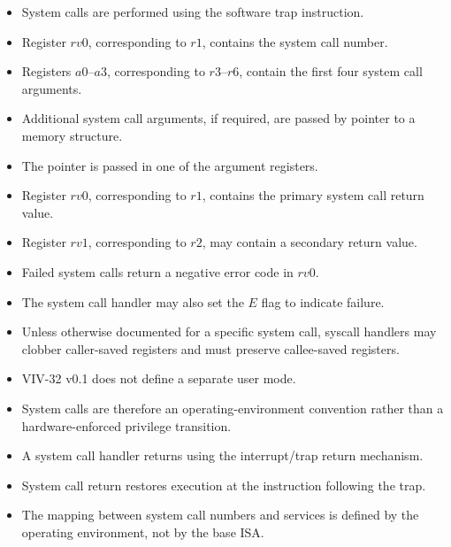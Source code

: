 \begin{itemize}
  \item System calls are performed using the software trap instruction.
  \item Register \(rv0\), corresponding to \(r1\), contains the system call number.
  \item Registers \(a0\)--\(a3\), corresponding to \(r3\)--\(r6\), contain the first four system call arguments.
  \item Additional system call arguments, if required, are passed by pointer to a memory structure.
  \item The pointer is passed in one of the argument registers.
  \item Register \(rv0\), corresponding to \(r1\), contains the primary system call return value.
  \item Register \(rv1\), corresponding to \(r2\), may contain a secondary return value.
  \item Failed system calls return a negative error code in \(rv0\).
  \item The system call handler may also set the \(E\) flag to indicate failure.
  \item Unless otherwise documented for a specific system call, syscall handlers may clobber caller-saved registers and must preserve callee-saved registers.
  \item VIV-32 v0.1 does not define a separate user mode.
  \item System calls are therefore an operating-environment convention rather than a hardware-enforced privilege transition.
  \item A system call handler returns using the interrupt/trap return mechanism.
  \item System call return restores execution at the instruction following the trap.
  \item The mapping between system call numbers and services is defined by the operating environment, not by the base ISA.
\end{itemize}
